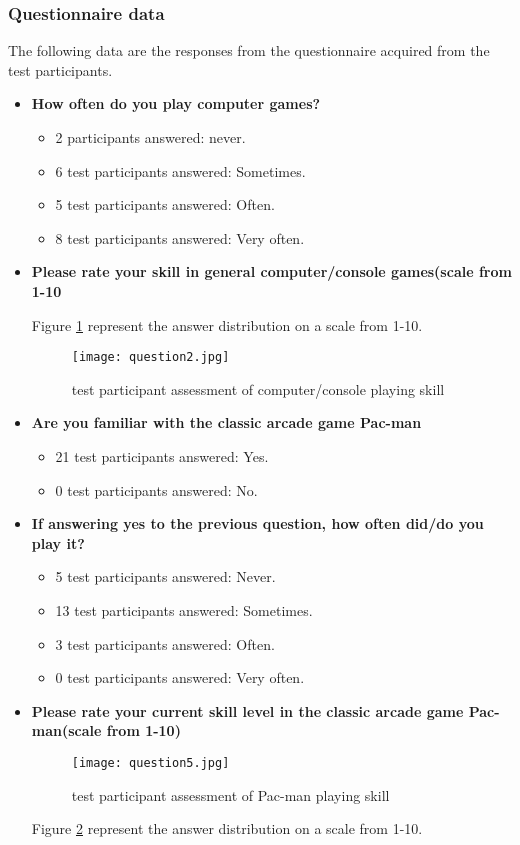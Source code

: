 \newpage
\subsubsection{Questionnaire data}
The following data are the responses from the questionnaire acquired from the test participants.

\begin{itemize}
\item \textbf{How often do you play computer games?}
\begin{itemize}
\item 2 participants answered: never.
\item 6 test participants answered: Sometimes.
\item 5 test participants answered: Often.
\item 8 test participants answered: Very often.
\end{itemize}
\item \textbf{Please rate your skill in general computer/console games(scale from 1-10}

Figure \ref{fig:question2} represent the answer distribution on a scale from 1-10.

\begin{figure}[!htbp]
\centering
\texttt{[image: question2.jpg]}
\caption{test participant assessment of computer/console playing skill}
\label{fig:question2}
\end{figure}

\item \textbf{Are you familiar with the classic arcade game Pac-man}
\begin{itemize}
\item 21 test participants answered: Yes.
\item 0 test participants answered: No.
\end{itemize}
\item \textbf{If answering yes to the previous question, how often did/do you play it?}
\begin{itemize}
\item 5 test participants answered: Never.
\item 13 test participants answered: Sometimes.
\item 3 test participants answered: Often.
\item 0 test participants answered: Very often.
\end{itemize}
\item \textbf{Please rate your current skill level in the classic arcade game Pac-man(scale from 1-10)}

\begin{figure}[!htbp]
\centering
\texttt{[image: question5.jpg]}
\caption{test participant assessment of Pac-man playing skill}
\label{fig:question5}
\end{figure}

Figure \ref{fig:question5} represent the answer distribution on a scale from 1-10.
\end{itemize}


